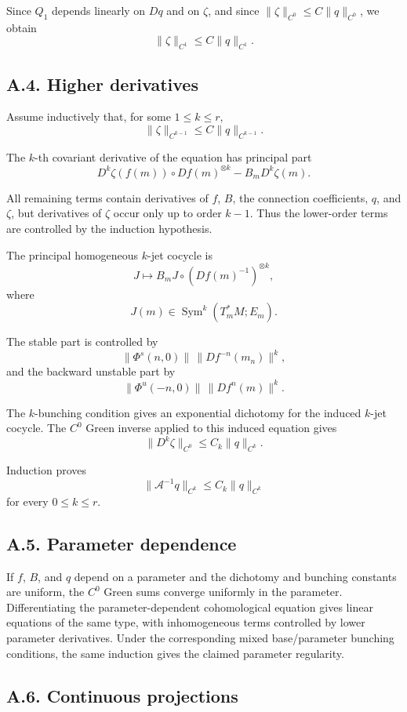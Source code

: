 \documentclass[12pt,a4paper]{article}
\theoremstyle{plain}
\numberwithin{equation}{section}
\numberwithin{theorem}{section}
\begin{document}
Since $Q_1$ depends linearly on $Dq$ and on $\zeta$, and since $\|\zeta\|_{C^0}\le C\|q\|_{C^0}$, we obtain
\[
\|\zeta\|_{C^1}\le C\|q\|_{C^1}.
\]

\subsection{A.4. Higher derivatives}

Assume inductively that, for some $1\le k\le r$,
\[
\|\zeta\|_{C^{k-1}}\le C\|q\|_{C^{k-1}}.
\]

The $k$-th covariant derivative of the equation has principal part
\[
D^k\zeta(f(m))\circ Df(m)^{\otimes k}-B_mD^k\zeta(m).
\]

All remaining terms contain derivatives of $f$, $B$, the connection coefficients, $q$, and $\zeta$, but derivatives of $\zeta$ occur only up to order $k-1$. Thus the lower-order terms are controlled by the induction hypothesis.

The principal homogeneous $k$-jet cocycle is
\[
J\mapsto B_mJ\circ(Df(m)^{-1})^{\otimes k},
\]
where
\[
J(m)\in \operatorname{Sym}^k(T_m^*M;E_m).
\]

The stable part is controlled by
\[
\|\Phi^s(n,0)\|\,\|Df^{-n}(m_n)\|^k,
\]
and the backward unstable part by
\[
\|\Phi^u(-n,0)\|\,\|Df^n(m)\|^k.
\]

The $k$-bunching condition gives an exponential dichotomy for the induced $k$-jet cocycle. The $C^0$ Green inverse applied to this induced equation gives
\[
\|D^k\zeta\|_{C^0}\le C_k\|q\|_{C^k}.
\]

Induction proves
\[
\|\mathcal A^{-1}q\|_{C^k}\le C_k\|q\|_{C^k}
\]
for every $0\le k\le r$.

\subsection{A.5. Parameter dependence}

If $f$, $B$, and $q$ depend on a parameter and the dichotomy and bunching constants are uniform, the $C^0$ Green sums converge uniformly in the parameter. Differentiating the parameter-dependent cohomological equation gives linear equations of the same type, with inhomogeneous terms controlled by lower parameter derivatives. Under the corresponding mixed base/parameter bunching conditions, the same induction gives the claimed parameter regularity.

\subsection{A.6. Continuous projections}
\end{document}
